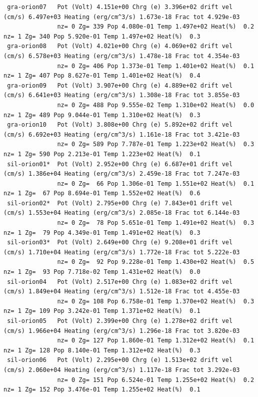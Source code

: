 {\begin{verbatim}
 gra-orion07   Pot (Volt) 4.151e+00 Chrg (e) 3.396e+02 drift vel (cm/s) 6.497e+03 Heating (erg/cm^3/s) 1.673e-18 Frac tot 4.929e-03
               nz= 0 Zg= 339 Pop 4.080e-01 Temp 1.497e+02 Heat(%)  0.2      nz= 1 Zg= 340 Pop 5.920e-01 Temp 1.497e+02 Heat(%)  0.3
 gra-orion08   Pot (Volt) 4.021e+00 Chrg (e) 4.069e+02 drift vel (cm/s) 6.578e+03 Heating (erg/cm^3/s) 1.478e-18 Frac tot 4.354e-03
               nz= 0 Zg= 406 Pop 1.373e-01 Temp 1.401e+02 Heat(%)  0.1      nz= 1 Zg= 407 Pop 8.627e-01 Temp 1.401e+02 Heat(%)  0.4
 gra-orion09   Pot (Volt) 3.907e+00 Chrg (e) 4.889e+02 drift vel (cm/s) 6.641e+03 Heating (erg/cm^3/s) 1.308e-18 Frac tot 3.855e-03
               nz= 0 Zg= 488 Pop 9.555e-02 Temp 1.310e+02 Heat(%)  0.0      nz= 1 Zg= 489 Pop 9.044e-01 Temp 1.310e+02 Heat(%)  0.3
 gra-orion10   Pot (Volt) 3.808e+00 Chrg (e) 5.892e+02 drift vel (cm/s) 6.692e+03 Heating (erg/cm^3/s) 1.161e-18 Frac tot 3.421e-03
               nz= 0 Zg= 589 Pop 7.787e-01 Temp 1.223e+02 Heat(%)  0.3      nz= 1 Zg= 590 Pop 2.213e-01 Temp 1.223e+02 Heat(%)  0.1
 sil-orion01*  Pot (Volt) 2.952e+00 Chrg (e) 6.687e+01 drift vel (cm/s) 1.386e+04 Heating (erg/cm^3/s) 2.459e-18 Frac tot 7.247e-03
               nz= 0 Zg=  66 Pop 1.306e-01 Temp 1.551e+02 Heat(%)  0.1      nz= 1 Zg=  67 Pop 8.694e-01 Temp 1.552e+02 Heat(%)  0.6
 sil-orion02*  Pot (Volt) 2.795e+00 Chrg (e) 7.843e+01 drift vel (cm/s) 1.553e+04 Heating (erg/cm^3/s) 2.085e-18 Frac tot 6.144e-03
               nz= 0 Zg=  78 Pop 5.651e-01 Temp 1.491e+02 Heat(%)  0.3      nz= 1 Zg=  79 Pop 4.349e-01 Temp 1.491e+02 Heat(%)  0.3
 sil-orion03*  Pot (Volt) 2.649e+00 Chrg (e) 9.208e+01 drift vel (cm/s) 1.710e+04 Heating (erg/cm^3/s) 1.772e-18 Frac tot 5.222e-03
               nz= 0 Zg=  92 Pop 9.228e-01 Temp 1.430e+02 Heat(%)  0.5      nz= 1 Zg=  93 Pop 7.718e-02 Temp 1.431e+02 Heat(%)  0.0
 sil-orion04   Pot (Volt) 2.517e+00 Chrg (e) 1.083e+02 drift vel (cm/s) 1.849e+04 Heating (erg/cm^3/s) 1.512e-18 Frac tot 4.455e-03
               nz= 0 Zg= 108 Pop 6.758e-01 Temp 1.370e+02 Heat(%)  0.3      nz= 1 Zg= 109 Pop 3.242e-01 Temp 1.371e+02 Heat(%)  0.1
 sil-orion05   Pot (Volt) 2.399e+00 Chrg (e) 1.278e+02 drift vel (cm/s) 1.966e+04 Heating (erg/cm^3/s) 1.296e-18 Frac tot 3.820e-03
               nz= 0 Zg= 127 Pop 1.860e-01 Temp 1.312e+02 Heat(%)  0.1      nz= 1 Zg= 128 Pop 8.140e-01 Temp 1.312e+02 Heat(%)  0.3
 sil-orion06   Pot (Volt) 2.295e+00 Chrg (e) 1.513e+02 drift vel (cm/s) 2.060e+04 Heating (erg/cm^3/s) 1.117e-18 Frac tot 3.292e-03
               nz= 0 Zg= 151 Pop 6.524e-01 Temp 1.255e+02 Heat(%)  0.2      nz= 1 Zg= 152 Pop 3.476e-01 Temp 1.255e+02 Heat(%)  0.1

\end{verbatim}}
